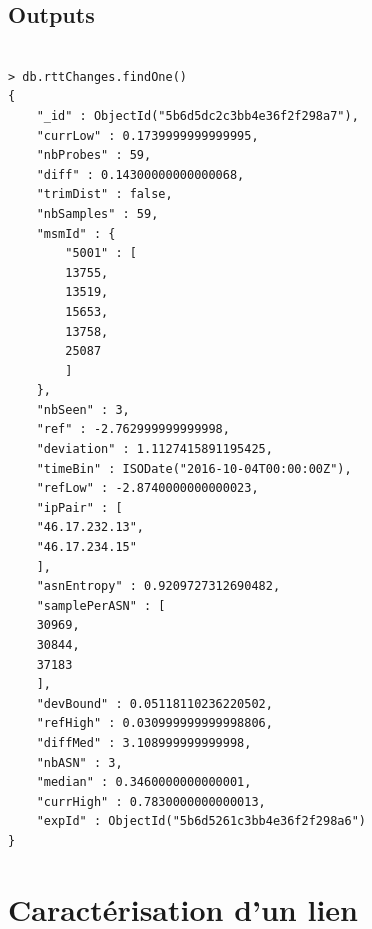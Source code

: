 \documentclass[]{report}
\begin{document}
\subsection{Outputs}

\begin{verbatim}

> db.rttChanges.findOne()
{
	"_id" : ObjectId("5b6d5dc2c3bb4e36f2f298a7"),
	"currLow" : 0.1739999999999995,
	"nbProbes" : 59,
	"diff" : 0.14300000000000068,
	"trimDist" : false,
	"nbSamples" : 59,
	"msmId" : {
		"5001" : [
		13755,
		13519,
		15653,
		13758,
		25087
		]
	},
	"nbSeen" : 3,
	"ref" : -2.762999999999998,
	"deviation" : 1.1127415891195425,
	"timeBin" : ISODate("2016-10-04T00:00:00Z"),
	"refLow" : -2.8740000000000023,
	"ipPair" : [
	"46.17.232.13",
	"46.17.234.15"
	],
	"asnEntropy" : 0.9209727312690482,
	"samplePerASN" : [
	30969,
	30844,
	37183
	],
	"devBound" : 0.05118110236220502,
	"refHigh" : 0.030999999999998806,
	"diffMed" : 3.108999999999998,
	"nbASN" : 3,
	"median" : 0.3460000000000001,
	"currHigh" : 0.7830000000000013,
	"expId" : ObjectId("5b6d5261c3bb4e36f2f298a6")
}
\end{verbatim}

\section{Caractérisation d'un lien}
\end{document}
